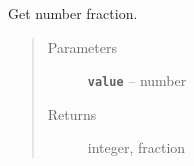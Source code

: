 \documentclass[letterpaper,10pt,english]{sphinxmanual}
\begin{document}
\begin{fulllineitems}
\begin{fulllineitems}
\end{fulllineitems}


\begin{fulllineitems}
\label{RRtoolbox.lib:RRtoolbox.lib.root.FactorConvert.split}
Get number fraction.
\begin{quote}\begin{description}
\item[{Parameters}] \leavevmode
\textbf{\texttt{value}} -- number

\item[{Returns}] \leavevmode
integer, fraction

\end{description}\end{quote}

\end{fulllineitems}


\end{fulllineitems}

\end{document}
